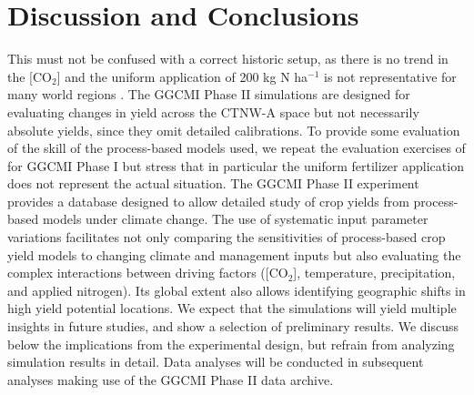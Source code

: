 \documentclass[gmd, manuscript]{copernicus} %
\begin{document}
\section{Discussion and Conclusions} 
\label{S:5}


This must not be confused with a correct historic setup, as there is no trend in the [CO$_2$] and the uniform application of 200 kg N ha$^{-1}$ is not representative for many world regions \citep{Elliott2015}.
The GGCMI Phase II simulations are designed for evaluating changes in yield across the CTNW-A space but not necessarily absolute yields, since they omit detailed calibrations. 
To provide some evaluation of the skill of the process-based models used, we repeat the evaluation exercises of \citet{muller_global_2017} for GGCMI Phase I but stress that in particular the uniform fertilizer application does not represent the actual situation.
The GGCMI Phase II experiment provides a database designed to allow detailed study of crop yields from process-based models under climate change. 
The use of systematic input parameter variations facilitates not only comparing the sensitivities of process-based crop yield models to changing climate and management inputs but also evaluating the complex interactions between driving factors ([CO$_2$], temperature, precipitation, and applied nitrogen). 
Its global extent also allows identifying geographic shifts in high yield potential locations. 
We expect that the simulations will yield multiple insights in future studies, and show a selection of preliminary results. 
We discuss below the implications from the experimental design, but refrain from analyzing simulation results in detail. 
Data analyses will be conducted in subsequent analyses making use of the GGCMI Phase II data archive.
\end{document}
